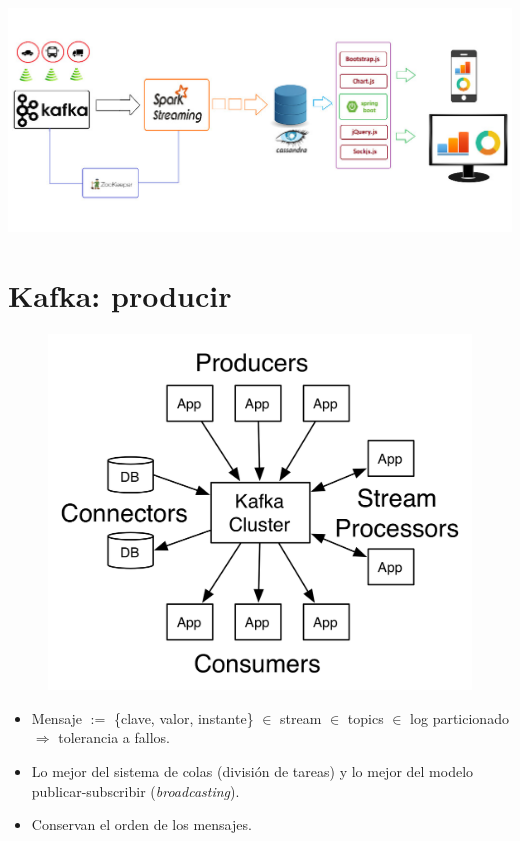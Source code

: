 \documentclass[dvipsnames]{beamer}
\begin{document}
        \begin{frame}
          \begin{center}
          \includegraphics[scale=0.3]{img/arquitectura.jpg}  
          \end{center}          
        \end{frame}

        \section{Kafka: producir}
	
	\begin{frame}
          \begin{figure}[H]
            \centering
            \includegraphics[scale=0.7]{img/kafka-apis.png}
          \end{figure}
          \begin{itemize}
          \item Mensaje $:=$ \{clave, valor, instante\} $\in$ stream $\in$ topics $\in$ log particionado $\Rightarrow$ \textcolor{deepRed}{tolerancia a fallos}.
          \item Lo mejor del sistema de colas (división de tareas) y lo mejor del modelo publicar-subscribir (\textit{broadcasting}).
          \item Conservan el orden de los mensajes.
          \end{itemize}
	\end{frame}
	
\end{document}
